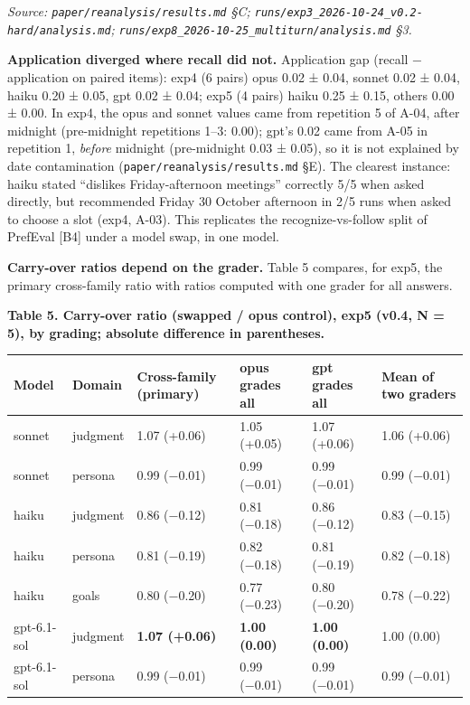 \documentclass[10pt]{article}
\begin{document}
\emph{Source: \texttt{paper/\allowbreak{}reanalysis/\allowbreak{}results.\allowbreak{}md} §C; \texttt{runs/\allowbreak{}exp3\_\allowbreak{}2026-\allowbreak{}10-\allowbreak{}24\_\allowbreak{}v0.\allowbreak{}2-\allowbreak{}hard/\allowbreak{}analysis.\allowbreak{}md}; \texttt{runs/\allowbreak{}exp8\_\allowbreak{}2026-\allowbreak{}10-\allowbreak{}25\_\allowbreak{}multiturn/\allowbreak{}analysis.\allowbreak{}md} §3.}

\textbf{Application diverged where recall did not.} Application gap (recall − application on paired items): exp4 (6 pairs) opus 0.02 ± 0.04, sonnet 0.02 ± 0.04, haiku 0.20 ± 0.05, gpt 0.02 ± 0.04; exp5 (4 pairs) haiku 0.25 ± 0.15, others 0.00 ± 0.00. In exp4, the opus and sonnet values came from repetition 5 of A-04, after midnight (pre-midnight repetitions 1--3: 0.00); gpt's 0.02 came from A-05 in repetition 1, \emph{before} midnight (pre-midnight 0.03 ± 0.05), so it is not explained by date contamination (\texttt{paper/\allowbreak{}reanalysis/\allowbreak{}results.\allowbreak{}md} §E). The clearest instance: haiku stated ``dislikes Friday-afternoon meetings'' correctly 5/5 when asked directly, but recommended Friday 30 October afternoon in 2/5 runs when asked to choose a slot (exp4, A-03). This replicates the recognize-vs-follow split of PrefEval {[}B4{]} under a model swap, in one model.

\textbf{Carry-over ratios depend on the grader.} Table 5 compares, for exp5, the primary cross-family ratio with ratios computed with one grader for all answers.

\textbf{Table 5. Carry-over ratio (swapped / opus control), exp5 (v0.4, N = 5), by grading; absolute difference in parentheses.}

{\def\LTcaptype{none} %
\begin{longtable}[]{@{}llllll@{}}
\toprule\noalign{}
Model & Domain & Cross-family (primary) & opus grades all & gpt grades all & Mean of two graders \\
\midrule\noalign{}
\endhead
\bottomrule\noalign{}
\endlastfoot
sonnet & judgment & 1.07 (+0.06) & 1.05 (+0.05) & 1.07 (+0.06) & 1.06 (+0.06) \\
sonnet & persona & 0.99 (−0.01) & 0.99 (−0.01) & 0.99 (−0.01) & 0.99 (−0.01) \\
haiku & judgment & 0.86 (−0.12) & 0.81 (−0.18) & 0.86 (−0.12) & 0.83 (−0.15) \\
haiku & persona & 0.81 (−0.19) & 0.82 (−0.18) & 0.81 (−0.19) & 0.82 (−0.18) \\
haiku & goals & 0.80 (−0.20) & 0.77 (−0.23) & 0.80 (−0.20) & 0.78 (−0.22) \\
gpt-6.1-sol & judgment & \textbf{1.07 (+0.06)} & \textbf{1.00 (0.00)} & \textbf{1.00 (0.00)} & 1.00 (0.00) \\
gpt-6.1-sol & persona & 0.99 (−0.01) & 0.99 (−0.01) & 0.99 (−0.01) & 0.99 (−0.01) \\
\end{longtable}
}
\end{document}
